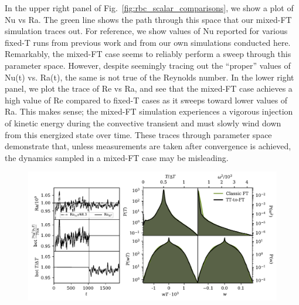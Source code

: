 \documentclass[aps, pre, onecolumn, nofootinbib, notitlepage, groupedaddress, amsfonts, amssymb, amsmath, longbibliography]{revtex4-1}
\begin{document}
In the upper right panel of Fig.~\ref{fig:rbc_scalar_comparisons}, we show a plot of Nu vs Ra.
The green line shows the path through this space that our mixed-FT simulation traces out.
For reference, we show values of Nu reported for various fixed-T runs from previous work and from our own simulations conducted here.
Remarkably, the mixed-FT case seems to reliably perform a sweep through this parameter space.
However, despite seemingly tracing out the ``proper'' values of Nu(t) vs. Ra(t), the same is not true of the Reynolds number.
In the lower right panel, we plot the trace of Re vs Ra, and see that the mixed-FT case achieves a high value of Re compared to fixed-T cases as it sweeps toward lower values of Ra.
This makes sense; the mixed-FT simulation experiences a vigorous injection of kinetic energy during the convective transient and must slowly wind down from this energized state over time.
These traces through parameter space demonstrate that, unless measurements are taken after convergence is achieved, the dynamics sampled in a mixed-FT case may be misleading.

\begin{figure}
\includegraphics[width=\textwidth]{./figs/rbc_restart_description.pdf}
\caption{ 
\label{fig:rbc_restart_description} }
\end{figure}
\end{document}
